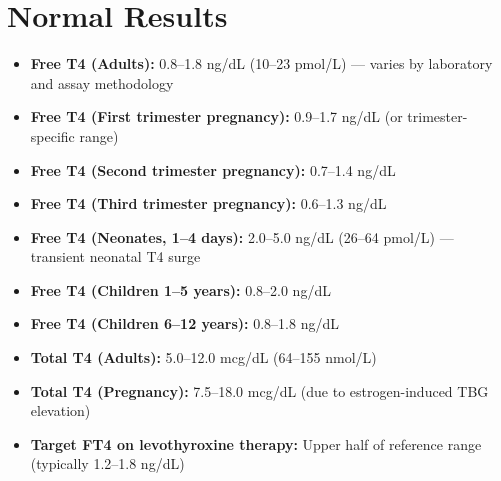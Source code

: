 \section*{Normal Results}
\begin{itemize}
  \item \textbf{Free T4 (Adults):} 0.8--1.8 ng/dL (10--23 pmol/L) --- varies by laboratory and assay methodology
  \item \textbf{Free T4 (First trimester pregnancy):} 0.9--1.7 ng/dL (or trimester-specific range)
  \item \textbf{Free T4 (Second trimester pregnancy):} 0.7--1.4 ng/dL
  \item \textbf{Free T4 (Third trimester pregnancy):} 0.6--1.3 ng/dL
  \item \textbf{Free T4 (Neonates, 1--4 days):} 2.0--5.0 ng/dL (26--64 pmol/L) --- transient neonatal T4 surge
  \item \textbf{Free T4 (Children 1--5 years):} 0.8--2.0 ng/dL
  \item \textbf{Free T4 (Children 6--12 years):} 0.8--1.8 ng/dL
  \item \textbf{Total T4 (Adults):} 5.0--12.0 mcg/dL (64--155 nmol/L)
  \item \textbf{Total T4 (Pregnancy):} 7.5--18.0 mcg/dL (due to estrogen-induced TBG elevation)
  \item \textbf{Target FT4 on levothyroxine therapy:} Upper half of reference range (typically 1.2--1.8 ng/dL)
\end{itemize}

